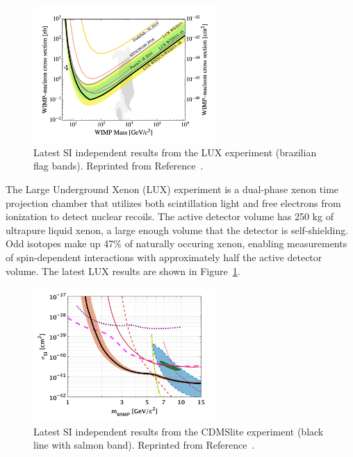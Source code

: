 \begin{figure}[htbp]
  \centering
  \includegraphics[width=0.625\textwidth]{DarkMatter/Figures/lux.png}
  \caption{
    Latest SI independent results from the LUX experiment (brazilian flag bands).
    Reprinted from Reference~\cite{}. %
  }
  \label{fig:dm_lux}
\end{figure}

The Large Underground Xenon (LUX) experiment is a  dual-phase xenon time projection chamber that utilizes both scintillation light and free electrons from ionization to detect nuclear recoils.
The active detector volume has 250 kg of ultrapure liquid xenon, a large enough volume that the detector is self-shielding.
Odd isotopes make up 47\% of naturally occuring xenon, enabling measurements of spin-dependent interactions with approximately half the active detector volume.
The latest LUX results are shown in Figure~\ref{fig:dm_lux}.

\begin{figure}[htbp]
  \centering
  \includegraphics[width=0.625\textwidth]{DarkMatter/Figures/cdms.png}
  \caption{
    Latest SI independent results from the CDMSlite experiment (black line with salmon band).
    Reprinted from Reference~\cite{}. %
  }
  \label{fig:dm_cdms}
\end{figure}

